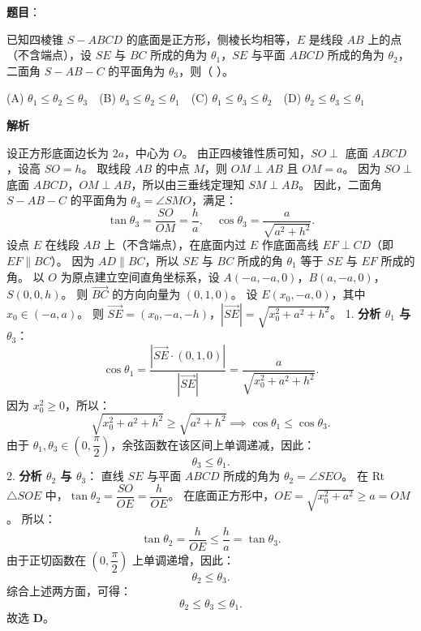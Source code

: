 \begin{answer}

\textbf{题目}：

已知四棱锥 $S - ABCD$ 的底面是正方形，侧棱长均相等，$E$ 是线段 $AB$ 上的点（不含端点），设 $SE$ 与 $BC$ 所成的角为 $\theta_1$，$SE$ 与平面 $ABCD$ 所成的角为 $\theta_2$，二面角 $S - AB - C$ 的平面角为 $\theta_3$，则（ ）。

(A) $\theta_1 \leqslant \theta_2 \leqslant \theta_3$　(B) $\theta_3 \leqslant \theta_2 \leqslant \theta_1$　(C) $\theta_1 \leqslant \theta_3 \leqslant \theta_2$　(D) $\theta_2 \leqslant \theta_3 \leqslant \theta_1$

\textbf{解析}

设正方形底面边长为 $2a$，中心为 $O$。
由正四棱锥性质可知，$SO \perp$ 底面 $ABCD$，设高 $SO = h$。
取线段 $AB$ 的中点 $M$，则 $OM \perp AB$ 且 $OM = a$。
因为 $SO \perp$ 底面 $ABCD$，$OM \perp AB$，所以由三垂线定理知 $SM \perp AB$。
因此，二面角 $S - AB - C$ 的平面角为 $\theta_3 = \angle SMO$，满足：
\nopagebreak[4]
\[\tan\theta_3 = \dfrac{SO}{OM} = \dfrac{h}{a},\quad \cos\theta_3 = \dfrac{a}{\sqrt{a^2 + h^2}}.\]
设点 $E$ 在线段 $AB$ 上（不含端点），在底面内过 $E$ 作底面高线 $EF \perp CD$（即 $EF \parallel BC$）。
因为 $AD \parallel BC$，所以 $SE$ 与 $BC$ 所成的角 $\theta_1$ 等于 $SE$ 与 $EF$ 所成的角。
以 $O$ 为原点建立空间直角坐标系，设 $A(-a, -a, 0)$，$B(a, -a, 0)$，$S(0, 0, h)$。
则 $\overrightarrow{BC}$ 的方向向量为 $(0, 1, 0)$。
设 $E(x_0, -a, 0)$，其中 $x_0 \in (-a, a)$。
则 $\overrightarrow{SE} = (x_0, -a, -h)$，$|\overrightarrow{SE}| = \sqrt{x_0^2 + a^2 + h^2}$。
1. \textbf{分析 $\theta_1$ 与 $\theta_3$}：
\nopagebreak[4]
\[\cos\theta_1 = \dfrac{|\overrightarrow{SE} \cdot (0, 1, 0)|}{|\overrightarrow{SE}|} = \dfrac{a}{\sqrt{x_0^2 + a^2 + h^2}}.\]
   因为 $x_0^2 \geqslant 0$，所以：
\nopagebreak[4]
\[\sqrt{x_0^2 + a^2 + h^2} \geqslant \sqrt{a^2 + h^2} \implies \cos\theta_1 \leqslant \cos\theta_3.\]
   由于 $\theta_1, \theta_3 \in \left(0, \dfrac\pi2\right)$，余弦函数在该区间上单调递减，因此：
\nopagebreak[4]
\[\theta_3 \leqslant \theta_1.\]
2. \textbf{分析 $\theta_2$ 与 $\theta_3$}：
   直线 $SE$ 与平面 $ABCD$ 所成的角为 $\theta_2 = \angle SEO$。
   在 Rt$\triangle SOE$ 中，$\tan\theta_2 = \dfrac{SO}{OE} = \dfrac{h}{OE}$。
   在底面正方形中，$OE = \sqrt{x_0^2 + a^2} \geqslant a = OM$。
   所以：
\nopagebreak[4]
\[\tan\theta_2 = \dfrac{h}{OE} \leqslant \dfrac{h}{a} = \tan\theta_3.\]
   由于正切函数在 $\left(0, \dfrac\pi2\right)$ 上单调递增，因此：
\nopagebreak[4]
\[\theta_2 \leqslant \theta_3.\]
综合上述两方面，可得：
\nopagebreak[4]
\[\theta_2 \leqslant \theta_3 \leqslant \theta_1.\]
故选 \textbf{D}。


\end{answer}

